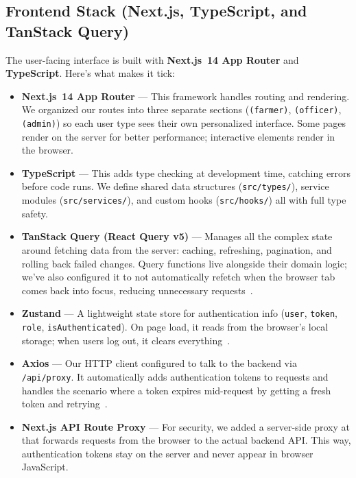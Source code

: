 \subsection{Frontend Stack (Next.js, TypeScript, and TanStack Query)}

The user-facing interface is built with \textbf{Next.js~14 App Router} and
\textbf{TypeScript}. Here's what makes it tick:

\begin{itemize}
  \item \textbf{Next.js~14 App Router} — This framework handles routing and
        rendering. We organized our routes into three separate sections
        (\texttt{(farmer)}, \texttt{(officer)}, \texttt{(admin)}) so each user
        type sees their own personalized interface. Some pages render on the
        server for better performance; interactive elements render in the browser.

  \item \textbf{TypeScript} — This adds type checking at development time,
        catching errors before code runs. We define shared data structures
        (\texttt{src/types/}), service modules (\texttt{src/services/}), and
        custom hooks (\texttt{src/hooks/}) all with full type safety.

  \item \textbf{TanStack Query (React Query v5)} — Manages all the complex state
        around fetching data from the server: caching, refreshing, pagination,
        and rolling back failed changes. Query functions live alongside their
        domain logic; we've also configured it to not automatically refetch when
        the browser tab comes back into focus, reducing unnecessary requests~\cite{tanstack2023query}.

  \item \textbf{Zustand} — A lightweight state store for authentication info
        (\texttt{user}, \texttt{token}, \texttt{role}, \texttt{isAuthenticated}).
        On page load, it reads from the browser's local storage; when users log
        out, it clears everything~\cite{zustand2023}.

  \item \textbf{Axios} — Our HTTP client configured to talk to the backend via
        \texttt{/api/proxy}. It automatically adds authentication tokens to
        requests and handles the scenario where a token expires mid-request by
        getting a fresh token and retrying~\cite{axios2024}.

  \item \textbf{Next.js API Route Proxy} — For security, we added a server-side
        proxy at \texttt{} that forwards requests from the
        browser to the actual backend API. This way, authentication tokens stay
        on the server and never appear in browser JavaScript.


\end{itemize}
